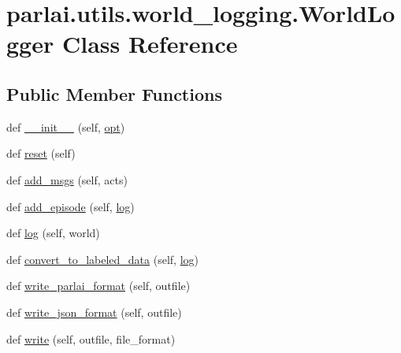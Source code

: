 \hypertarget{classparlai_1_1utils_1_1world__logging_1_1WorldLogger}{}\section{parlai.\+utils.\+world\+\_\+logging.\+World\+Logger Class Reference}
\label{classparlai_1_1utils_1_1world__logging_1_1WorldLogger}
\subsection*{Public Member Functions}
\begin{DoxyCompactItemize}
\item 
def \hyperlink{classparlai_1_1utils_1_1world__logging_1_1WorldLogger_aecf78591417c85526b5f3efb75bbdca1}{\+\_\+\+\_\+init\+\_\+\+\_\+} (self, \hyperlink{classparlai_1_1utils_1_1world__logging_1_1WorldLogger_aaf2ae02c76953a68916b5136c1d2cc31}{opt})
\item 
def \hyperlink{classparlai_1_1utils_1_1world__logging_1_1WorldLogger_ae53d57ea1f9df92d06b7d63bd8235bd5}{reset} (self)
\item 
def \hyperlink{classparlai_1_1utils_1_1world__logging_1_1WorldLogger_a42938edb3589e1f3a5754cc200e85f64}{add\+\_\+msgs} (self, acts)
\item 
def \hyperlink{classparlai_1_1utils_1_1world__logging_1_1WorldLogger_a457d1512dcc0920eb2e745506783c8b0}{add\+\_\+episode} (self, \hyperlink{classparlai_1_1utils_1_1world__logging_1_1WorldLogger_a98460ce773e615dabd51e1f3ffb45db3}{log})
\item 
def \hyperlink{classparlai_1_1utils_1_1world__logging_1_1WorldLogger_a98460ce773e615dabd51e1f3ffb45db3}{log} (self, world)
\item 
def \hyperlink{classparlai_1_1utils_1_1world__logging_1_1WorldLogger_a712d20e5ace03e3729258b61472c2023}{convert\+\_\+to\+\_\+labeled\+\_\+data} (self, \hyperlink{classparlai_1_1utils_1_1world__logging_1_1WorldLogger_a98460ce773e615dabd51e1f3ffb45db3}{log})
\item 
def \hyperlink{classparlai_1_1utils_1_1world__logging_1_1WorldLogger_a9a5210ac32adcaec88d4b33265cbba92}{write\+\_\+parlai\+\_\+format} (self, outfile)
\item 
def \hyperlink{classparlai_1_1utils_1_1world__logging_1_1WorldLogger_aeb4a988aa27d9cd9a5df43feefff9748}{write\+\_\+json\+\_\+format} (self, outfile)
\item 
def \hyperlink{classparlai_1_1utils_1_1world__logging_1_1WorldLogger_af895ff20c1c2b3896c46def75a968df0}{write} (self, outfile, file\+\_\+format)
\end{DoxyCompactItemize}
